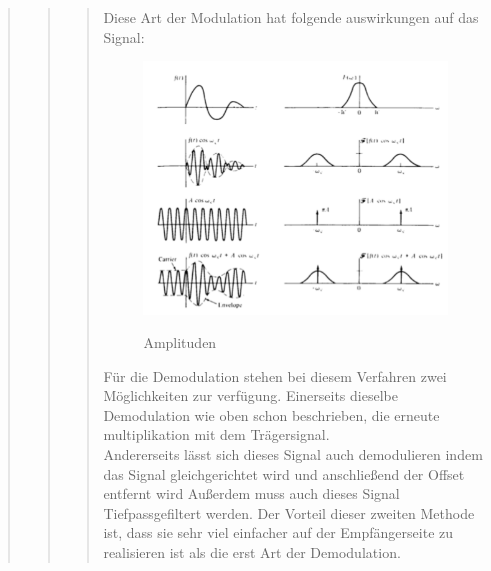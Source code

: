 \begin{quote}
\begin{quote}
\begin{quote}
            Diese Art der Modulation hat folgende auswirkungen auf das Signal:
            
            \begin{figure}[H]
            \centering
                \includegraphics[scale=0.7, trim = 0cm 0cm 0cm 0cm, clip]{./Bilder/AMmittraegersignal}
                    \caption{Amplituden}
                    \cite{AMmitUeber}
            \end{figure}
            
            Für die Demodulation stehen bei diesem Verfahren zwei Möglichkeiten zur verfügung. Einerseits dieselbe
            Demodulation wie oben schon beschrieben, die erneute multiplikation mit dem Trägersignal.\\
            Andererseits lässt sich dieses Signal auch demodulieren indem das Signal gleichgerichtet wird und
            anschließend der Offset entfernt wird Außerdem muss auch dieses Signal Tiefpassgefiltert werden. Der Vorteil
            dieser zweiten Methode ist, dass sie sehr viel einfacher auf der Empfängerseite zu realisieren ist als die erst 
            Art der Demodulation.
    
		      
		\end{quote}
        
        
    \end{quote}
    

\end{quote}
